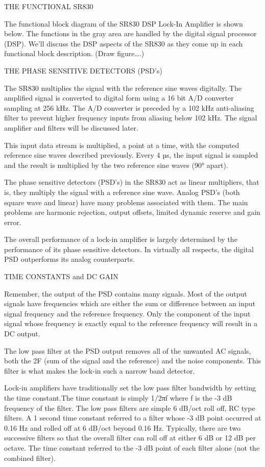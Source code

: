 \documentclass[final,5p,12pt,twocolumn]{elsaarticle}
\begin{document}
THE FUNCTIONAL SR830

The functional block diagram of the SR830 DSP Lock-In Amplifier is shown below. The functions in the gray area are handled by the digital signal processor (DSP). We'll discuss the DSP aspects of the SR830 as they come up in each functional block description.
(Draw figure….)

THE PHASE SENSITIVE DETECTORS (PSD's)

The SR830 multiplies the signal with the reference sine waves digitally. The amplified signal is converted to digital form using a 16 bit A/D converter sampling at 256 kHz. The A/D converter is preceded by a 102 kHz anti-aliasing filter to prevent higher frequency inputs from aliasing below 102 kHz. The signal amplifier and filters will be discussed later.

This input data stream is multiplied, a point at a time, with the computed reference sine
waves described previously. Every 4 µs, the input signal is sampled and the result is multiplied by the two reference sine waves (90° apart).

The phase sensitive detectors (PSD's) in the
SR830 act as linear multipliers, that is, they multiply the signal with a reference sine wave. Analog PSD's (both square wave and linear) have many problems associated with them. The main problems are harmonic rejection, output offsets, limited dynamic reserve and gain error.

The overall performance of a lock-in amplifier is largely determined by the performance of its phase sensitive detectors. In virtually all respects, the digital PSD outperforms its analog counterparts. 

TIME CONSTANTS and DC GAIN

Remember, the output of the PSD contains many signals. Most of the output signals have frequencies which are either the sum or difference between an input signal frequency and the reference frequency. Only the component of the input signal whose frequency is exactly equal to the reference frequency will result in a DC output.

The low pass filter at the PSD output removes all of the unwanted AC signals, both the 2F (sum of the signal and the reference) and the noise components. This filter is what makes the lock-in such a narrow band detector.

Lock-in amplifiers have traditionally set the low pass filter bandwidth by setting the time constant.The time constant is simply 1/2πf where f is the -3 dB frequency of the filter. The low pass filters are simple 6 dB/oct roll off, RC type filters. A 1 second time constant referred to a filter whose -3 dB point occurred at 0.16 Hz and rolled off at 6 dB/oct beyond 0.16 Hz. Typically, there are two successive filters so that the overall filter can roll off at either 6 dB or 12 dB per octave. The time constant referred to the -3 dB point of each filter alone (not the combined filter).
\end{document}
